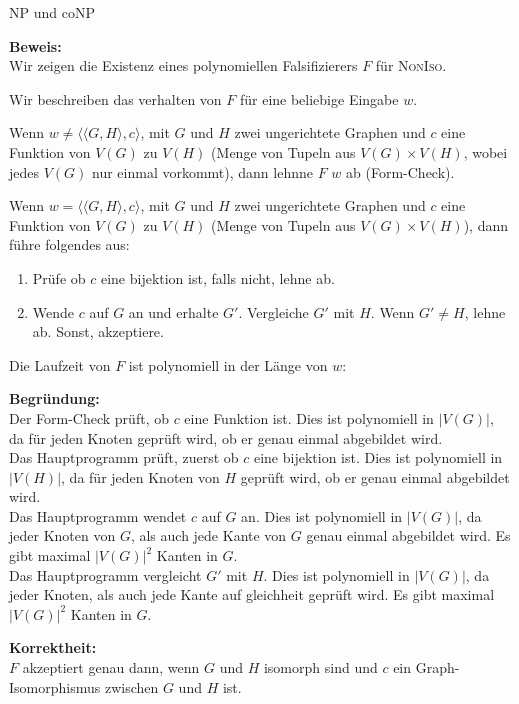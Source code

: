\documentclass[answers]{submit}
\begin{document}
\begin{exercise}[12]{NP und coNP}
{\begin{enumerate}
            \textbf{Beweis:} \\

            Wir zeigen die Existenz eines polynomiellen Falsifizierers $F$ für \textsc{NonIso}.

            Wir beschreiben das verhalten von $F$ für eine beliebige Eingabe $w$.

            Wenn $w\neq \langle \langle G, H\rangle, c\rangle$, mit $G$ und $H$ zwei ungerichtete Graphen
            und $c$ eine Funktion von $V(G)$ zu $V(H)$ (Menge von Tupeln aus $V(G)\times V(H)$, wobei jedes $V(G)$ nur einmal vorkommt), dann lehnne $F$ $w$ ab (Form-Check).

            Wenn $w=\langle \langle G, H\rangle, c\rangle$, mit $G$ und $H$ zwei ungerichtete Graphen
            und $c$ eine Funktion von $V(G)$ zu $V(H)$ (Menge von Tupeln aus $V(G)\times V(H)$), dann führe folgendes aus:

            \begin{enumerate}
              \item Prüfe ob $c$ eine bijektion ist, falls nicht, lehne ab.
              \item Wende $c$ auf $G$ an und erhalte $G'$. Vergleiche $G'$ mit $H$. Wenn $G'\neq H$, lehne ab. Sonst, akzeptiere.
            \end{enumerate}

            Die Laufzeit von $F$ ist polynomiell in der Länge von $w$:

            \textbf{Begründung:} \\
            Der Form-Check prüft, ob $c$ eine Funktion ist. Dies ist polynomiell in $|V(G)|$, da für jeden Knoten geprüft wird, ob er genau einmal abgebildet wird. \\
            Das Hauptprogramm prüft, zuerst ob $c$ eine bijektion ist. Dies ist polynomiell in $|V(H)|$, da für jeden Knoten von $H$ geprüft wird, ob er genau einmal abgebildet wird. \\
            Das Hauptprogramm wendet $c$ auf $G$ an. Dies ist polynomiell in $|V(G)|$, da jeder Knoten von $G$, als auch jede Kante von $G$ genau einmal abgebildet wird. Es gibt maximal $|V(G)|^2$ Kanten in $G$. \\
            Das Hauptprogramm vergleicht $G'$ mit $H$. Dies ist polynomiell in $|V(G)|$, da jeder Knoten, als auch jede Kante auf gleichheit geprüft wird. Es gibt maximal $|V(G)|^2$ Kanten in $G$.

            \textbf{Korrektheit:} \\
            $F$ akzeptiert genau dann, wenn $G$ und $H$ isomorph sind und $c$ ein Graph-Isomorphismus zwischen $G$ und $H$ ist.


\end{enumerate}}
\end{exercise}
\end{document}
